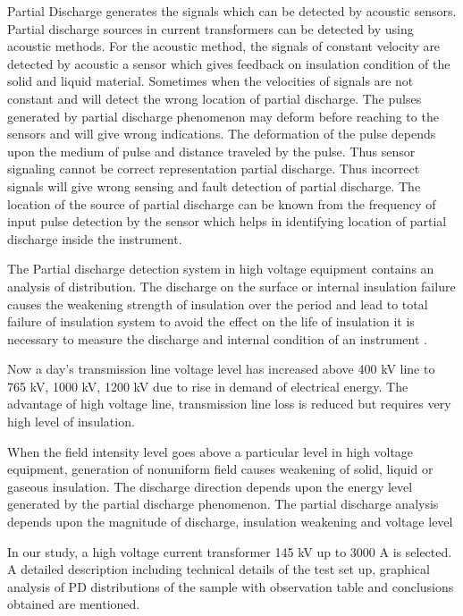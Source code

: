 Partial Discharge generates the signals which can be detected by acoustic sensors. Partial discharge sources in current transformers can be detected by using acoustic methods. For the acoustic method, the signals of constant velocity are detected by acoustic a sensor which gives feedback on insulation condition of the solid and liquid material. Sometimes when the velocities of signals are not constant and will detect the wrong location of partial discharge. The pulses generated by partial discharge phenomenon may deform before reaching to the sensors and will give wrong indications. The deformation of the pulse depends upon the medium of pulse and distance traveled by the pulse. Thus sensor signaling cannot be correct representation partial discharge. Thus incorrect signals will give wrong sensing and fault detection of partial discharge. The location of the source of partial discharge can be known from the frequency of input pulse detection by the sensor which helps in identifying location of partial discharge inside the instrument.

 The Partial discharge detection system in high voltage equipment contains an analysis of distribution. The discharge on the surface or internal insulation failure causes the weakening strength of insulation over the period and lead to total failure of insulation system to avoid the effect on the life of insulation it is necessary to measure the discharge and internal condition of an instrument \cite{kuffel2000high2}.
 
Now a day's transmission line voltage level has increased above 400 kV line to 765 kV, 1000 kV, 1200 kV due to rise in demand of electrical energy. The advantage of high voltage line, transmission line loss is reduced but requires very high level of insulation. 

When the field intensity level goes above a particular level in high voltage equipment, generation of nonuniform field causes weakening of solid, liquid or gaseous insulation. The discharge direction depends upon the energy level generated by the partial discharge phenomenon. The partial discharge analysis depends upon the magnitude of discharge, insulation weakening and voltage level \cite{gockenbach2004partial}

In our study, a high voltage current transformer 145 kV up to 3000 A is selected. A detailed description including technical details of the test set up, graphical analysis of PD distributions of the sample with observation table and conclusions obtained are mentioned.


